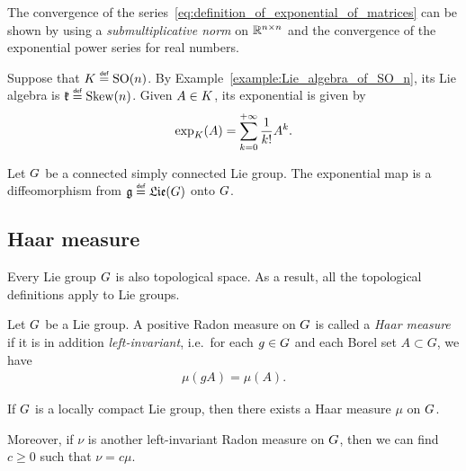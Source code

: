 The convergence of the series~\eqref{eq:definition_of_exponential_of_matrices} can be shown
by using a \emph{submultiplicative norm} on ${\mathbb{R}}^{n \times n}$
and the convergence of the exponential power series for real numbers.

\begin{example}
    Suppose that $\CompactGroup \defeq \SpecialOrthogonalGroup n$.
    By Example~\ref{example:Lie_algebra_of_SO_n},
    its Lie algebra is $\LieAlgebraCompactGroup \defeq \SkewSymmetric n$.
    Given $A \in K$,
    its exponential is given by
    \begin{align*}
        \exp_K(A) = \sum_{k = 0}^{+\infty} \frac 1 {k!} A^k.
    \end{align*}
\end{example}

\begin{proposition}
    Let $G$ be a connected simply connected Lie group.
    The exponential map is a diffeomorphism from $\LieAlgebra \defeq \Lie(\Group)$ onto $G$.
\end{proposition}

\subsection{Haar measure}

\begin{remark}
    Every Lie group $G$ is also topological space.
    As a result, all the topological definitions apply to Lie groups.
\end{remark}

\begin{definition}
    Let $G$ be a Lie group.
    A positive Radon measure on $G$ is called a \emph{Haar measure}
    if it is in addition \emph{left-invariant},
    i.e.\ for each $g \in G$ and each Borel set $A \subset G$, we have
    \begin{align*}
        \mu(g A) = \mu(A).
    \end{align*}
\end{definition}

\begin{proposition}
    If $G$ is a locally compact Lie group,
    then there exists a Haar measure $\mu$ on $G$.

    Moreover, if $\nu$ is another left-invariant Radon measure on $G$,
    then we can find $c \geq 0$ such that $\nu = c \mu$.
\end{proposition}

